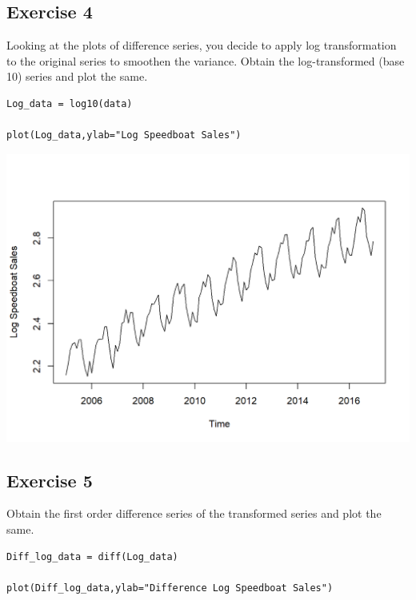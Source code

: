 \documentclass[a4paper,12pt]{article}
\begin{document}

\newpage 

\subsection*{Exercise 4}
\noindent Looking at the plots of difference series, you decide to apply log transformation to the
original series to smoothen the variance. Obtain the log-transformed (base 10) series
and plot the same. 
\begin{framed}
\begin{verbatim}
Log_data = log10(data)

plot(Log_data,ylab="Log Speedboat Sales")
\end{verbatim}
\end{framed}
\includegraphics[]{00-B2/images/Speedboat_5.png}


\newpage 

\subsection*{Exercise 5}
\noindent  Obtain the first order difference series of the transformed series and plot the same. 

\begin{framed}
\begin{verbatim}
Diff_log_data = diff(Log_data)

plot(Diff_log_data,ylab="Difference Log Speedboat Sales")
\end{verbatim}
\end{framed}
\end{document}

